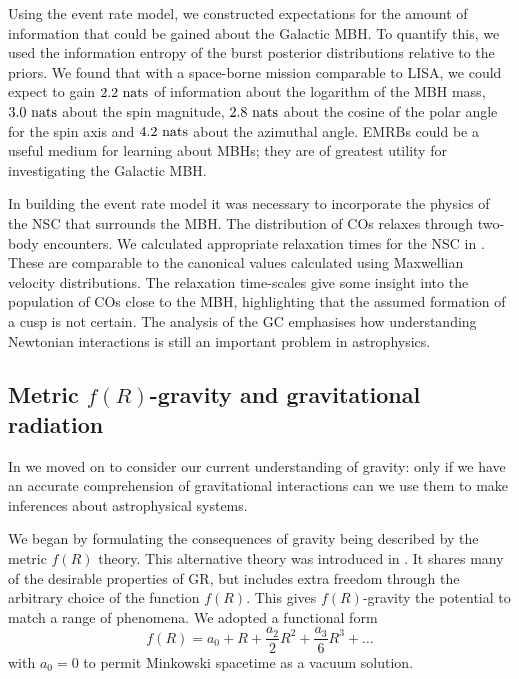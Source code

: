 Using the event rate model, we constructed expectations for the amount of information that could be gained about the Galactic MBH. To quantify this, we used the information entropy of the burst posterior distributions relative to the priors. We found that with a space-borne mission comparable to LISA, we could expect to gain $2.2~\mathrm{nats}$ of information about the logarithm of the MBH mass, $3.0~\mathrm{nats}$ about the spin magnitude, $2.8~\mathrm{nats}$ about the cosine of the polar angle for the spin axis and $4.2~\mathrm{nats}$ about the azimuthal angle. EMRBs could be a useful medium for learning about MBHs; they are of greatest utility for investigating the Galactic MBH.

In building the event rate model it was necessary to incorporate the physics of the NSC that surrounds the MBH. The distribution of COs relaxes through two-body encounters. We calculated appropriate relaxation times for the NSC in . These are comparable to the canonical values calculated using Maxwellian velocity distributions. The relaxation time-scales give some insight into the population of COs close to the MBH, highlighting that the assumed formation of a cusp is not certain. The analysis of the GC emphasises how understanding Newtonian interactions is still an important problem in astrophysics.

\subsection{Metric $f(R)$-gravity and gravitational radiation}\label{sec:Review-f-R}

In  we moved on to consider our current understanding of gravity: only if we have an accurate comprehension of gravitational interactions can we use them to make inferences about astrophysical systems.

We began by formulating the consequences of gravity being described by the metric $f(R)$ theory. This alternative theory was introduced in . It shares many of the desirable properties of GR, but includes extra freedom through the arbitrary choice of the function $f(R)$. This gives $f(R)$-gravity the potential to match a range of phenomena. We adopted a functional form
\begin{equation}
f(R) = a_0 + R + \frac{a_2}{2}R^2 + \frac{a_3}{6}R^3 + \ldots
\end{equation}
with $a_0 = 0$ to permit Minkowski spacetime as a vacuum solution.

